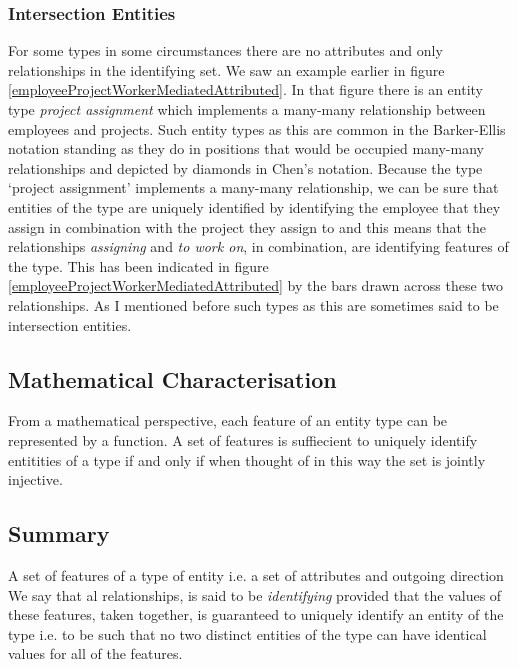 \subsubsection{Intersection Entities}
\mynote {}
For some types in some circumstances there are no attributes and only relationships in the identifying set. 
We saw an example earlier
in figure \ref{employeeProjectWorkerMediatedAttributed}. In that figure there
is an entity type
\textit{project assignment} which implements a many-many relationship between employees and projects. 
Such entity types as this are common in the Barker-Ellis notation 
standing as they do in positions that would be occupied many-many relationships
 and depicted by  diamonds in Chen's notation. 
 Because the type `project assignment' implements a many-many relationship, we can be sure that entities of the type  are uniquely identified by 
 identifying the employee that they assign in combination with the project they assign to and this means that the relationships \textit{assigning} and \textit{to work on}, in combination, are identifying features of the type. This has been indicated in 
figure  \ref{employeeProjectWorkerMediatedAttributed} by the bars drawn across these two relationships. As I mentioned before such types as this are sometimes said to be intersection entities.


\subsection {Mathematical Characterisation}
\mynote From a mathematical perspective, 
each feature of an entity type can be represented by a function. A set of features is suffiecient to uniquely identify entitities of a type if and only if when thought  of in this way the set is jointly injective.   



 

\subsection{Summary}
\mynote A set of features of a type of entity i.e. a set of attributes and outgoing direction We say that al relationships, is said to be \textit{identifying} provided that the values of these features,
taken together, is guaranteed to uniquely identify an entity of the type i.e. to be such that no two distinct entities of the type can have identical values for all of the features. 


